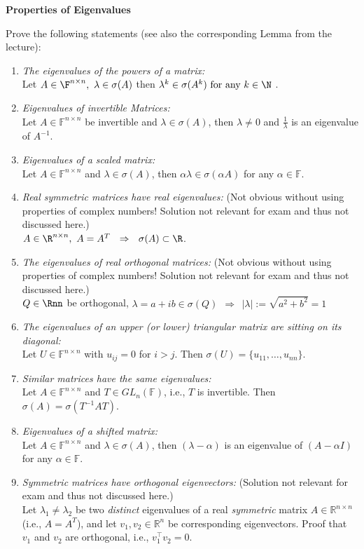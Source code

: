 \textbf{Properties of Eigenvalues}

Prove the following statements (see also the corresponding Lemma from the lecture):
\begin{enumerate}
	\item  \textit{The eigenvalues of the powers of a matrix:}\\ 
	Let $A \in \F^{n\times n} ,~\lambda \in \sigma(A)$ then $\lambda^k \in \sigma(A^k)~\text{for any}~k\in \N$ .
	\item	\textit{Eigenvalues of invertible Matrices:}\\ Let $A\in \mathbb{F}^{n \times n}$ be invertible and $\lambda \in \sigma(A)$, then $\lambda \neq 0$ and $\frac{1}{\lambda}$ is an eigenvalue of $A^{-1}$.
	\item \textit{Eigenvalues of a scaled matrix:}\\ 
	Let $A\in \mathbb{F}^{n \times n}$ and $\lambda \in \sigma(A)$, then $\alpha\lambda \in \sigma(\alpha A)$ for any $\alpha \in \mathbb{F}$.
	\item \textit{Real symmetric matrices have real eigenvalues:} {\small\color{red}(Not obvious without using properties of complex numbers! Solution not relevant for exam and thus not discussed here.)}\\ $A \in \R^{n\times n},~A = A^T ~~\Rightarrow~~ \sigma(A)\subset\R$.
	\item \textit{The eigenvalues of real orthogonal matrices:} {\small\color{red}(Not obvious without using properties of complex numbers! Solution not relevant for exam and thus not discussed here.)}\\
	$Q \in \Rnn$ be orthogonal, $\lambda = a+ib \in \sigma(Q) ~~\Rightarrow~~|\lambda|:=\sqrt{a^2+b^2}=1$
	\item \textit{The eigenvalues of an upper (or lower) triangular matrix are sitting on its diagonal:}\\ 
	Let $U\in \mathbb{F}^{n \times n}$ with $u_{ij} = 0$ for $i > j$. Then $\sigma(U) = \{u_{11}, \ldots, u_{nn}\}$.
	\item \textit{Similar matrices have the same eigenvalues:}\\ Let $A \in \mathbb{F}^{n \times n}$ and $T \in GL_n(\mathbb{F})$, i.e., $T$ is invertible. Then $\sigma(A) = \sigma(T^{-1}AT)$.
	\item\textit{Eigenvalues of a shifted matrix:}\\ Let $A\in \mathbb{F}^{n \times n}$ and $\lambda \in \sigma(A)$, then $(\lambda - \alpha)$ is an eigenvalue of $(A - \alpha I)$ for any $\alpha \in \mathbb{F}$.
	\item \textit{Symmetric matrices have orthogonal eigenvectors:} {\small\color{red}(Solution not relevant for exam and thus not discussed here.)}\\ Let $\lambda_1 \neq \lambda_2$ be two \textit{distinct} eigenvalues of a real \textit{symmetric} matrix $A \in \mathbb{R}^{n \times n}$ (i.e., $A = A^T$), and let 
$v_1, v_2 \in \mathbb{R}^n$ be corresponding eigenvectors. Proof that $v_1$ and $v_2$ are orthogonal, i.e., $v_1^\top v_2 = 0$.
\end{enumerate}
